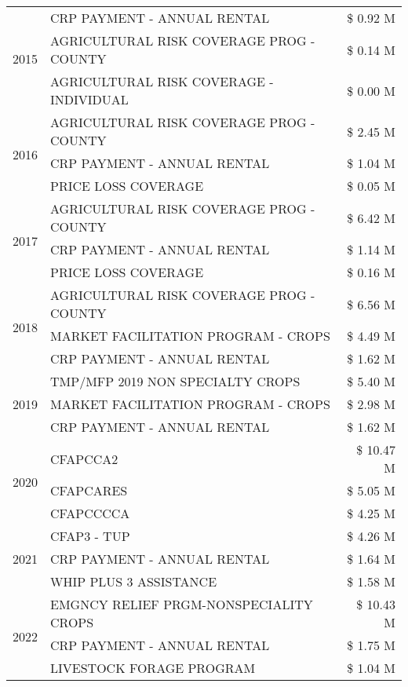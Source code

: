 \begin{tabular}{llr}
\cline{1-3}
\multirow[t]{3}{*}{2015} & CRP PAYMENT - ANNUAL RENTAL & \$ 0.92 M \\
 & AGRICULTURAL RISK COVERAGE PROG - COUNTY & \$ 0.14 M \\
 & AGRICULTURAL RISK COVERAGE - INDIVIDUAL & \$ 0.00 M \\
\cline{1-3}
\multirow[t]{3}{*}{2016} & AGRICULTURAL RISK COVERAGE PROG - COUNTY & \$ 2.45 M \\
 & CRP PAYMENT - ANNUAL RENTAL & \$ 1.04 M \\
 & PRICE LOSS COVERAGE & \$ 0.05 M \\
\cline{1-3}
\multirow[t]{3}{*}{2017} & AGRICULTURAL RISK COVERAGE PROG - COUNTY & \$ 6.42 M \\
 & CRP PAYMENT - ANNUAL RENTAL & \$ 1.14 M \\
 & PRICE LOSS COVERAGE & \$ 0.16 M \\
\cline{1-3}
\multirow[t]{3}{*}{2018} & AGRICULTURAL RISK COVERAGE PROG - COUNTY & \$ 6.56 M \\
 & MARKET FACILITATION PROGRAM - CROPS & \$ 4.49 M \\
 & CRP PAYMENT - ANNUAL RENTAL & \$ 1.62 M \\
\cline{1-3}
\multirow[t]{3}{*}{2019} & TMP/MFP 2019 NON SPECIALTY CROPS & \$ 5.40 M \\
 & MARKET FACILITATION PROGRAM - CROPS & \$ 2.98 M \\
 & CRP PAYMENT - ANNUAL RENTAL & \$ 1.62 M \\
\cline{1-3}
\multirow[t]{3}{*}{2020} & CFAPCCA2 & \$ 10.47 M \\
 & CFAPCARES & \$ 5.05 M \\
 & CFAPCCCCA & \$ 4.25 M \\
\cline{1-3}
\multirow[t]{3}{*}{2021} & CFAP3 - TUP & \$ 4.26 M \\
 & CRP PAYMENT - ANNUAL RENTAL & \$ 1.64 M \\
 & WHIP PLUS 3 ASSISTANCE & \$ 1.58 M \\
\cline{1-3}
\multirow[t]{3}{*}{2022} & EMGNCY RELIEF PRGM-NONSPECIALITY CROPS & \$ 10.43 M \\
 & CRP PAYMENT - ANNUAL RENTAL & \$ 1.75 M \\
 & LIVESTOCK FORAGE PROGRAM & \$ 1.04 M \\
\cline{1-3}
\bottomrule
\end{tabular}

